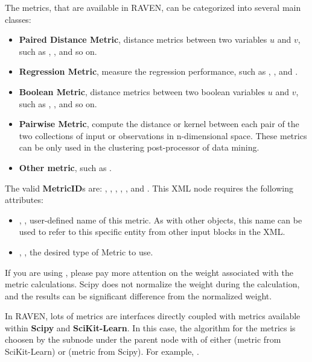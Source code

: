 The metrics, that are available in RAVEN, can be categorized into several main classes:
\begin{itemize}
  \item \textbf{Paired Distance Metric}, distance metrics between two variables $u$ and $v$, such as ,
    ,  and so on.
  \item \textbf{Regression Metric}, measure the regression performance, such as ,
    ,  and .
  \item \textbf{Boolean Metric}, distance metrics between two boolean variables $u$ and $v$, such as
    , ,  and so on.
  \item \textbf{Pairwise Metric}, compute the distance or kernel between each pair of the two collections of input
    or observations in n-dimensional space.
    \nb These metrics can be only used in the clustering post-processor of data mining.
  \item \textbf{Other metric}, such as .
\end{itemize}

The valid \textbf{MetricID}s are: , , , , , and . This XML node requires the following attributes:
\begin{itemize}
  \item {}, , user-defined name of this metric. \nb As with other
    objects, this name can be used to refer to this specific entity from other input blocks in the XML.
  \item {}, , the desired type of Metric to use.
\end{itemize}

\nb If you are using , please pay more attention on the weight associated with the metric
calculations. Scipy does not normalize the weight during the calculation, and the results can be significant difference
from the normalized weight.

In RAVEN, lots of metrics are interfaces directly coupled with metrics available within \textbf{Scipy} and
\textbf{SciKit-Learn}. In this case, the algorithm for the metrics is choosen by the subnode 
under the parent node with  of either  (metric from SciKit-Learn) or
 (metric from Scipy). For
example, .

